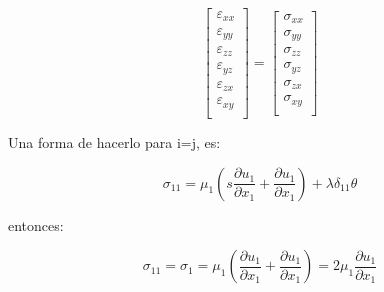 \documentclass{article}
\begin{document}
\begin{equation}
\begin{bmatrix}
 \varepsilon_{xx} \\
 \varepsilon_{yy} \\
 \varepsilon_{zz} \\
 \varepsilon_{yz} \\
 \varepsilon_{zx} \\
 \varepsilon_{xy} \\
\end{bmatrix}
=
\begin{bmatrix}
 \sigma_{xx} \\
 \sigma_{yy} \\
 \sigma_{zz} \\
 \sigma_{yz} \\
 \sigma_{zx} \\
 \sigma_{xy} \\
\end{bmatrix}
\end{equation}


Una  forma de  hacerlo para i=j, es:

\begin{equation}
 \sigma_{11}= \mu_{1}(s\dfrac{\partial u_{1}}{\partial x_{1}} + \dfrac{\partial u_{1}}{\partial x_{1}})+ \lambda \delta_{11}\theta
\end{equation}

entonces:

\begin{equation}
 \sigma_{11}= \sigma_{1}= \mu_{1}(\dfrac{\partial u_{1}}{\partial x_{1}} + \dfrac{\partial u_{1}}{\partial x_{1}})=  2\mu_{1}\dfrac{\partial u_{1}}{\partial x_{1}} 
\end{equation}
\end{document}
